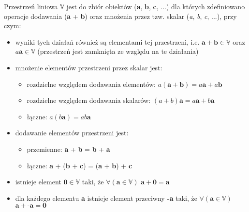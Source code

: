 \documentclass[12pt,a4paper,twoside,openany]{book}
\begin{document}
Przestrzeń liniowa $\mathbb{V}$ jest do zbiór obiektów (\textbf{a}, \textbf{b}, \textbf{c}, ...) dla których zdefiniowano operacje dodawania (\textbf{a} + \textbf{b}) oraz mnożenia przez tzw. skalar (\textit{a}, \textit{b}, \textit{c}, ...), przy czym: \newline
\begin{itemize}
    \item wyniki tych działań również są elementami tej przestrzeni, i.e. $\textbf{a} + \textbf{b} \in \mathbb{V}$ oraz $\textit{a}\textbf{a} \in \mathbb{V}$ (przestrzeń jest zamknięta ze względu na te działania) \newline
    \item mnożenie elementów przestrzeni przez skalar jest:
    \begin{itemize}
        \item rozdzielne względem dodawania elementów: \newline
         $\textit{a}(\textbf{a} + \textbf{b}) = \textit{a}\textbf{a} + \textit{a}\textbf{b}$
         \item rozdzielne względem dodawania skalarów: \newline
         $(\textit{a} + \textit{b})\textbf{a} = \textit{a}\textbf{a} + \textit{b}\textbf{a}$
         \item łączne: \newline
         $\textit{a}(\textit{b}\textbf{a}) = \textit{a}\textit{b}\textbf{a}$ \newline
         
    \end{itemize}
    \item dodawanie elementów przestrzeni jest:
    \begin{itemize}
        \item przemienne: \newline
        \textbf{a} + \textbf{b} = \textbf{b} + \textbf{a}
        \item łączne: \newline
        \textbf{a} + (\textbf{b} + \textbf{c}) = (\textbf{a} + \textbf{b}) + \textbf{c} \newline
    \end{itemize}
    \item istnieje element $\textbf{0}\in\mathbb{V}$ taki, że \newline $\forall(\textbf{a}\in\mathbb{V})$  $\textbf{a} + \textbf{0} = \textbf{a}$ \newline
    \item dla każdego elementu \textbf{a} istnieje element przeciwny \textbf{-a} taki, że \newline $\forall(\textbf{a}\in\mathbb{V})$  $\textbf{a} + \textbf{-a} = \textbf{0}$ \newline
\end{itemize}
\end{document}
